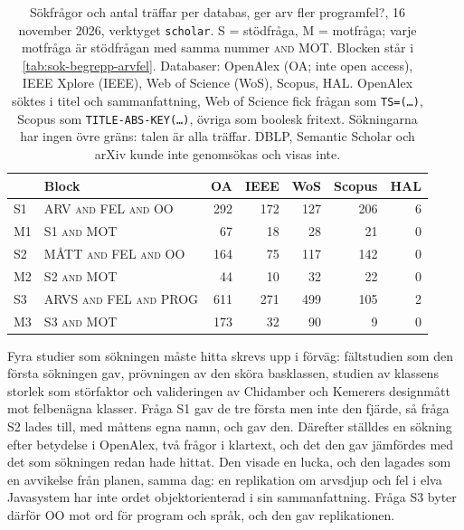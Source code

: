 \begin{table}[!htb]
  \centering
  \caption{Sökfrågor och antal träffar per databas, ger arv fler
    programfel?, 16 november 2026, verktyget \texttt{scholar}.  S =
    stödfråga, M = motfråga; varje motfråga är stödfrågan med samma
    nummer \textsc{and} MOT.  Blocken står i
    \cref{tab:sok-begrepp-arvfel}.  Databaser: OpenAlex (OA; inte
    \foreignlanguage{english}{open access}), IEEE Xplore (IEEE), Web of
    Science (WoS), Scopus, HAL.  OpenAlex söktes i titel och
    sammanfattning, Web of Science fick frågan som \texttt{TS=(\dots)},
    Scopus som \texttt{TITLE-ABS-KEY(\dots)}, övriga som boolesk
    fritext.  Sökningarna har ingen övre gräns: talen är alla träffar.
    DBLP, Semantic Scholar och arXiv kunde inte genomsökas och visas
    inte.}
  \label{tab:sok-queries-arvfel}
  \footnotesize
  \begin{tabular}{@{}llrrrrr@{}}
    \toprule
    & Block & OA & IEEE & WoS & Scopus & HAL \\
    \midrule
    S1 & ARV \textsc{and} FEL \textsc{and} OO & 292 & 172 & 127 & 206 & 6 \\
    M1 & S1 \textsc{and} MOT & 67 & 18 & 28 & 21 & 0 \\
    S2 & MÅTT \textsc{and} FEL \textsc{and} OO & 164 & 75 & 117 & 142 & 0 \\
    M2 & S2 \textsc{and} MOT & 44 & 10 & 32 & 22 & 0 \\
    S3 & ARVS \textsc{and} FEL \textsc{and} PROG & 611 & 271 & 499 & 105 & 2 \\
    M3 & S3 \textsc{and} MOT & 173 & 32 & 90 & 9 & 0 \\
    \bottomrule
  \end{tabular}
\end{table}

Fyra studier som sökningen måste hitta skrevs upp i förväg:
fältstudien som den första sökningen gav\autocite{CartwrightShepperd2000},
prövningen av den sköra basklassen\autocite{Sabane2017}, studien av
klassens storlek som störfaktor\autocite{ElEmam2001Confounding} och
valideringen av Chidamber och Kemerers designmått mot felbenägna
klasser\autocite{Basili1996Validation}.  Fråga S1 gav de tre första men
inte den fjärde, så fråga S2 lades till, med måttens egna namn, och gav
den.  Därefter ställdes en sökning efter betydelse i OpenAlex, två frågor
i klartext, och det den gav jämfördes med det som sökningen redan hade
hittat.  Den visade en lucka, och den lagades som en avvikelse från
planen, samma dag: en replikation om arvsdjup och fel i elva
Javasystem\autocite{Counsell2021WhereBugs} har inte ordet
objektorienterad i sin sammanfattning.  Fråga S3 byter därför OO mot ord
för program och språk, och den gav replikationen.

